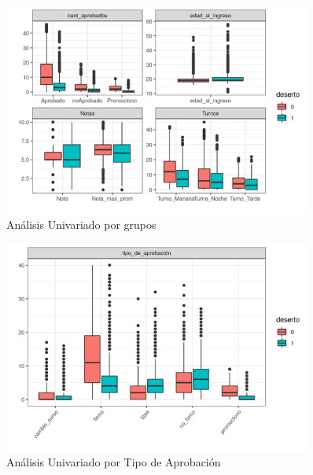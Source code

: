 















\begin{figure}[!htb]
	\centering
	\includegraphics[width=0.9\textwidth]{imagenes/imagenes/gg_explo_tablon_grupo.png}
	\caption{Análisis Univariado por grupos}
	\label{fig:tablon_boxplot_grupo}
\end{figure}

\begin{figure}[!htb]
	\centering
	\includegraphics[width=0.9\textwidth]{imagenes/imagenes/gg_explo_tablon_tipo_aprob.png}
	\caption{Análisis Univariado por Tipo de Aprobación}
	\label{fig:tablon_boxplot_tipoAprobacion}
\end{figure}


